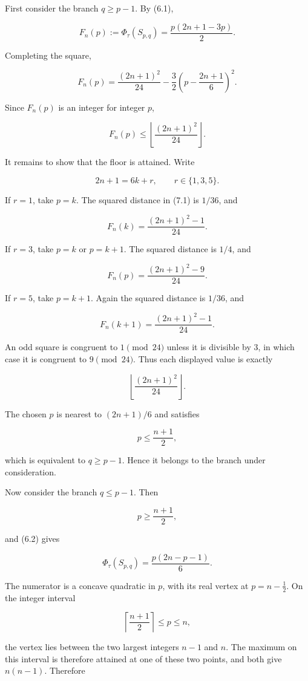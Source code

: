 \documentclass[
  11pt,
]{article}
\begin{document}
First consider the branch \(q\ge p-1\). By (6.1),

\[
F_n(p)
:=
\Phi_\tau(S_{p,q})
=
\frac{p(2n+1-3p)}2.
\]

Completing the square,

\[
F_n(p)
=
\frac{(2n+1)^2}{24}
-
\frac32
\left(
p-\frac{2n+1}{6}
\right)^2.
\tag{7.1}
\]

Since \(F_n(p)\) is an integer for integer \(p\),

\[
F_n(p)
\le
\left\lfloor\frac{(2n+1)^2}{24}\right\rfloor.
\]

It remains to show that the floor is attained. Write

\[
2n+1=6k+r,
\qquad
r\in\{1,3,5\}.
\]

If \(r=1\), take \(p=k\). The squared distance in (7.1) is \(1/36\), and

\[
F_n(k)
=
\frac{(2n+1)^2-1}{24}.
\]

If \(r=3\), take \(p=k\) or \(p=k+1\). The squared distance is \(1/4\),
and

\[
F_n(p)
=
\frac{(2n+1)^2-9}{24}.
\]

If \(r=5\), take \(p=k+1\). Again the squared distance is \(1/36\), and

\[
F_n(k+1)
=
\frac{(2n+1)^2-1}{24}.
\]

An odd square is congruent to \(1\pmod{24}\) unless it is divisible by
\(3\), in which case it is congruent to \(9\pmod{24}\). Thus each
displayed value is exactly

\[
\left\lfloor\frac{(2n+1)^2}{24}\right\rfloor.
\]

The chosen \(p\) is nearest to \((2n+1)/6\) and satisfies

\[
p\le\frac{n+1}{2},
\]

which is equivalent to \(q\ge p-1\). Hence it belongs to the branch
under consideration.

Now consider the branch \(q\le p-1\). Then

\[
p\ge\frac{n+1}{2},
\]

and (6.2) gives

\[
\Phi_\tau(S_{p,q})
=
\frac{p(2n-p-1)}6.
\]

The numerator is a concave quadratic in \(p\), with its real vertex at
\(p=n-\tfrac12\). On the integer interval

\[
\left\lceil\frac{n+1}{2}\right\rceil
\le p\le n,
\]

the vertex lies between the two largest integers \(n-1\) and \(n\). The
maximum on this interval is therefore attained at one of these two
points, and both give \(n(n-1)\). Therefore
\end{document}
